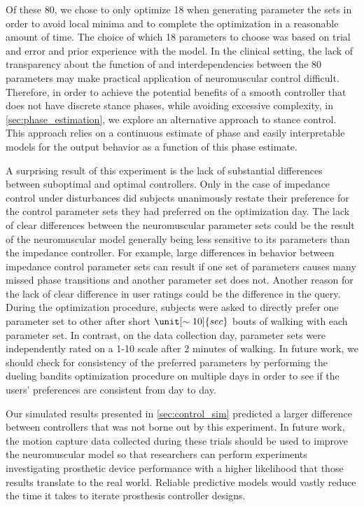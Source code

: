 Of these 80, we chose to only optimize 18 when generating parameter the sets in
order to avoid local minima and to complete the optimization in a reasonable
amount of time. The choice of which 18 parameters to choose was based on trial
and error and prior experience with the model. In the clinical setting, the lack
of transparency about the function of and interdependencies between the 80
parameters may make practical application of neuromuscular control difficult.
Therefore, in order to achieve the potential benefits of a smooth controller
that does not have discrete stance phases, while avoiding excessive complexity,
in \cref{sec:phase_estimation}, we explore an alternative approach to stance
control. This approach relies on a continuous estimate of phase and easily
interpretable models for the output behavior as a function of this phase
estimate.

A surprising result of this experiment is the lack of substantial differences
between suboptimal and optimal controllers. Only in the case of impedance
control under disturbances did subjects unanimously restate their preference for
the control parameter sets they had preferred on the optimization day. The lack
of clear differences between the neuromuscular parameter sets could be the
result of the neuromuscular model generally being less sensitive to its
parameters than the impedance controller. For example, large differences in
behavior between impedance control parameter sets can result if one set of
parameters causes many missed phase transitions and another parameter set does
not. Another reason for the lack of clear difference in user ratings could be
the difference in the query. During the optimization procedure, subjects were
asked to directly prefer one parameter set to other after short
$\unit[\sim10]{sec}$ bouts of walking with each parameter set. In contrast, on
the data collection day, parameter sets were independently rated on a 1-10 scale
after 2 minutes of walking. In future work, we should check for consistency of
the preferred parameters by performing the dueling bandits optimization
procedure on multiple days in order to see if the users' preferences are
consistent from day to day.

Our simulated results presented in \cref{sec:control_sim} predicted a larger
difference between controllers that was not borne out by this experiment.  In
future work, the motion capture data collected during these trials should be
used to improve the neuromuscular model so that researchers can perform
experiments investigating prosthetic device performance with a higher likelihood
that those results translate to the real world. Reliable predictive models would
vastly reduce the time it takes to iterate prosthesis controller designs.

